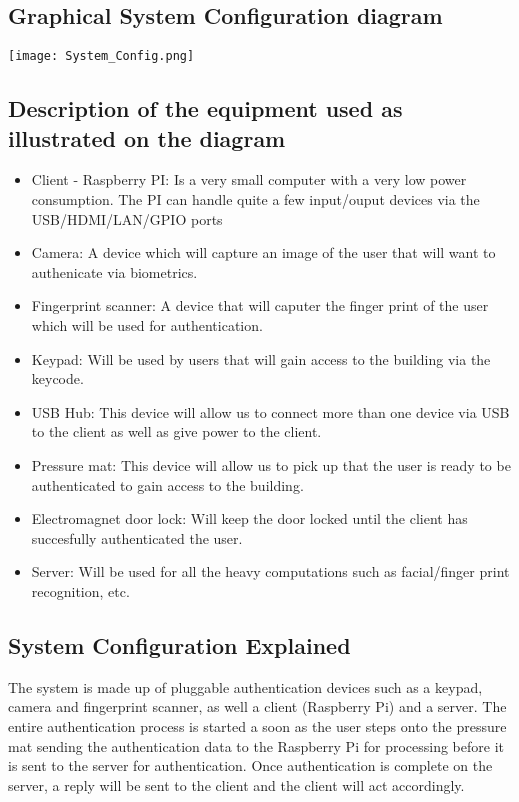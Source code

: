 \subsection{Graphical System Configuration diagram}

\texttt{[image: System\_Config.png]}

\subsection{Description of the equipment used as illustrated on the diagram}
\begin{itemize}
\item Client - Raspberry PI: Is a very small computer with a very low power consumption. The PI can handle quite a few input/ouput devices via the USB/HDMI/LAN/GPIO ports
\item Camera: A device which will capture an image of the user that will want to authenicate via biometrics.
\item Fingerprint scanner: A device that will caputer the finger print of the user which will be used for authentication.
\item Keypad: Will be used by users that will gain access to the building via the keycode.
\item USB Hub: This device will allow us to connect more than one device via USB to the client as well as give power to the client.
\item Pressure mat: This device will allow us to pick up that the user is ready to be authenticated to gain access to the building.
\item Electromagnet door lock: Will keep the door locked until the client has succesfully authenticated the user.
\item Server: Will be used for all the heavy computations such as facial/finger print recognition, etc.
\end{itemize}

\subsection{System Configuration Explained}
The system is made up of pluggable authentication devices such as a keypad, camera and fingerprint scanner, as well a client (Raspberry Pi) and a server. The entire authentication process is started a soon as the user steps onto the pressure mat sending the authentication data to the Raspberry Pi for processing before it is sent to the server for authentication. Once authentication is complete on the server, a reply will be sent to the client and the client will act accordingly.

